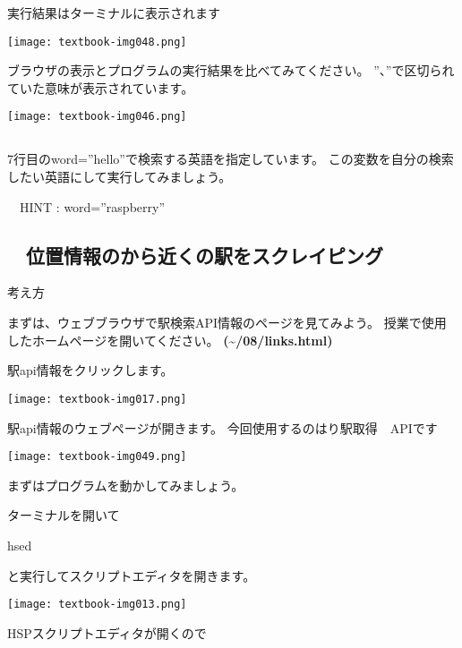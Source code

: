 実行結果はターミナルに表示されます

\begin{center}
    \texttt{[image: textbook-img048.png]}
\end{center}

\clearpage
ブラウザの表示とプログラムの実行結果を比べてみてください。
”、”で区切られていた意味が表示されています。
\begin{center}
    \texttt{[image: textbook-img046.png]}
\end{center}

\subsection*{\theQuestion\label{Q:weblio}}
7行目のword=”hello”で検索する英語を指定しています。
この変数を自分の検索したい英語にして実行してみましょう。

\ \ HINT : word=”raspberry”

\clearpage
\subsection*{\theExercise　位置情報のから近くの駅をスクレイピング}
\addtocounter{Exercise}{-1}\label{E:station}
\noindent 考え方

まずは、ウェブブラウザで駅検索API情報のページを見てみよう。
授業で使用したホームページを開いてください。
\textbf{({\textasciitilde}/08/links.html)}

駅api情報をクリックします。

\begin{center}
    \texttt{[image: textbook-img017.png]}
\end{center}

駅api情報のウェブページが開きます。
今回使用するのはり駅取得　APIです

\begin{center}
    \texttt{[image: textbook-img049.png]}
\end{center}

\clearpage
まずはプログラムを動かしてみましょう。

ターミナルを開いて

hsed

と実行してスクリプトエディタを開きます。
\begin{center}
  \texttt{[image: textbook-img013.png]}
\end{center}
HSPスクリプトエディタが開くので

